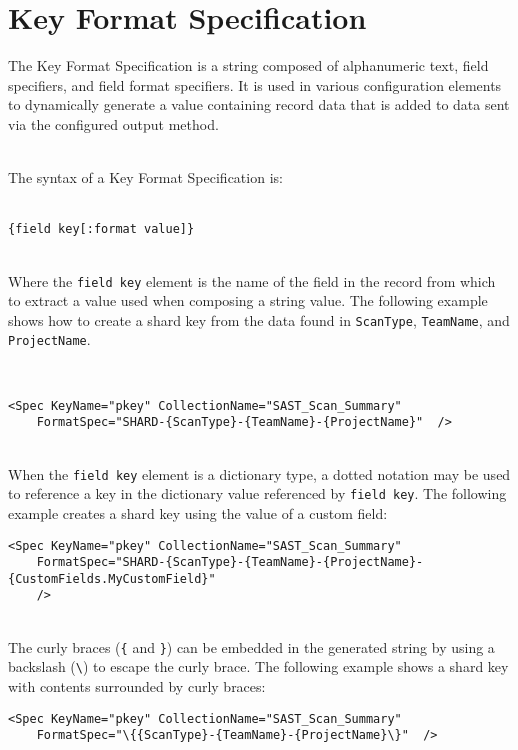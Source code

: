 \chapter{Key Format Specification}\label{chap:key_format_spec}

The Key Format Specification is a string composed of alphanumeric text, field specifiers, and field format specifiers.  It is used in various configuration
elements to dynamically generate a value containing record data that is added to data sent via the configured output method.

\noindent\\The syntax of a Key Format Specification is:

\noindent\\\texttt{\{field key[:format value]\}}

\noindent\\Where the \texttt{field key} element is the name of the field in the record from which to extract a value used when composing a string value.
The following example shows how to create a shard key from the data found in \texttt{ScanType}, \texttt{TeamName}, and \texttt{ProjectName}.

\noindent\\
\lstset{language=XML}
\begin{lstlisting}
<Spec KeyName="pkey" CollectionName="SAST_Scan_Summary" 
    FormatSpec="SHARD-{ScanType}-{TeamName}-{ProjectName}"  />
\end{lstlisting}


\noindent\\When the \texttt{field key} element is a dictionary type, a dotted notation may be used to reference a key in the dictionary
value referenced by \texttt{field key}.  The following example creates a shard key using the value of a custom field:

\begin{lstlisting}
<Spec KeyName="pkey" CollectionName="SAST_Scan_Summary" 
    FormatSpec="SHARD-{ScanType}-{TeamName}-{ProjectName}-{CustomFields.MyCustomField}"
    />
\end{lstlisting}


\noindent\\The curly braces (\texttt{\{} and \texttt{\}}) can be embedded in the generated string by using a backslash (\texttt{\textbackslash}) to escape 
the curly brace.  The following example shows a shard key with contents surrounded by curly braces:

\begin{lstlisting}
<Spec KeyName="pkey" CollectionName="SAST_Scan_Summary"
    FormatSpec="\{{ScanType}-{TeamName}-{ProjectName}\}"  />
\end{lstlisting}

